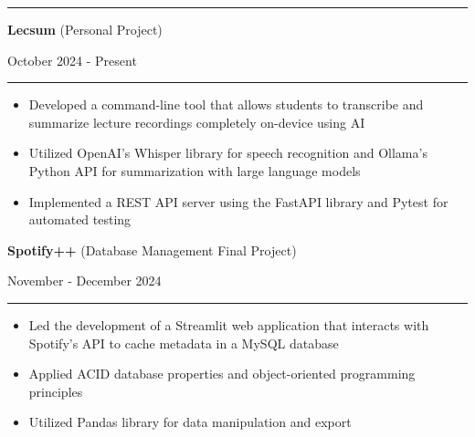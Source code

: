 \documentclass[letter]{article}
\begin{document}
    \medskip
    \vspace{4pt}
    \hrule height 1pt
    \vspace{4pt}

    \noindent
    \begin{minipage}[c]{0.7\linewidth}
        \noindent \textbf{Lecsum} (Personal Project)
    \end{minipage}
    \begin{minipage}[c]{0.291\linewidth}
        \begin{flushright}
            October 2024 - Present
        \end{flushright}
    \end{minipage}
    \vspace{4pt}
    \hrule
    \vspace{4pt}
    \noindent
    \begin{itemize}[noitemsep, topsep=0pt]
        \item Developed a command-line tool that allows students to transcribe and summarize lecture recordings completely on-device using AI
        \item Utilized OpenAI's Whisper library for speech recognition and Ollama's Python API for summarization with large language models
        \item Implemented a REST API server using the FastAPI library and Pytest for automated testing
    \end{itemize}
    \medskip

    \noindent
    \begin{minipage}[c]{0.7\linewidth}
        \noindent \textbf{Spotify++} (Database Management Final Project)
    \end{minipage}
    \begin{minipage}[c]{0.291\linewidth}
        \begin{flushright}
            November - December 2024
        \end{flushright}
    \end{minipage}
    \vspace{4pt}
    \hrule
    \vspace{4pt}
    \noindent
    \begin{itemize}[noitemsep, topsep=0pt]
        \item Led the development of a Streamlit web application that interacts with Spotify's API to cache metadata in a MySQL database
        \item Applied ACID database properties and object-oriented programming principles
        \item Utilized Pandas library for data manipulation and export
    \end{itemize}
    \medskip
\end{document}
